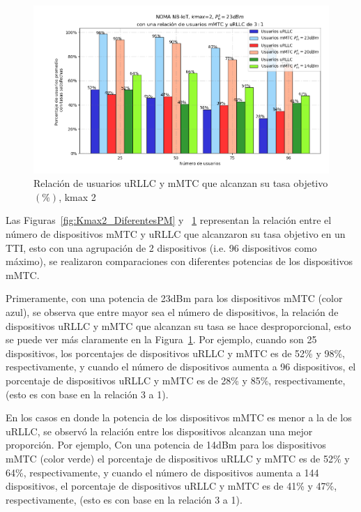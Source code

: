 \begin{figure}[th]
    \centering
    \includegraphics[scale=.6]{Figures/ResultadosNOMA/Kmax2_DiferentesPM_Porcentual.png}
    \decoRule
    \caption[Relación de usuarios uRLLC y mMTC que alcanzan su tasa objetivo $(\%)$, kmax 2]{Relación de usuarios uRLLC y mMTC que alcanzan su tasa objetivo$(\%)$, kmax 2}
    \label{fig:Kmax2_DiferentesPM_Porcentual}
\end{figure}

Las Figuras~\ref{fig:Kmax2_DiferentesPM} y ~\ref{fig:Kmax2_DiferentesPM_Porcentual} representan la relación entre el número de dispositivos mMTC y uRLLC que alcanzaron su tasa objetivo en un TTI, esto con una agrupación de 2 dispositivos (i.e. 96 dispositivos como máximo), se realizaron comparaciones con diferentes potencias de los dispositivos mMTC.\newline

Primeramente, con una potencia de 23dBm para los dispositivos mMTC (color azul), se observa que entre mayor sea el número de dispositivos, la relación de dispositivos uRLLC y mMTC que alcanzan su tasa se hace desproporcional, esto se puede ver más claramente en la Figura~\ref{fig:Kmax2_DiferentesPM_Porcentual}. Por ejemplo, cuando son 25 dispositivos, los porcentajes de dispositivos uRLLC y mMTC es de 52\% y 98\%, respectivamente, y cuando el número de dispositivos aumenta a 96 dispositivos, el porcentaje de dispositivos uRLLC y mMTC es de 28\% y 85\%, respectivamente, (esto es con base en la relación 3 a 1). \newline

En los casos en donde la potencia de los dispositivos mMTC es menor a la de los uRLLC, se observó la relación entre los dispositivos alcanzan una mejor proporción. Por ejemplo, Con una potencia de 14dBm para los dispositivos mMTC (color verde) el porcentaje de dispositivos uRLLC y mMTC es de 52\% y 64\%, respectivamente, y cuando el número de dispositivos aumenta a 144 dispositivos, el porcentaje de dispositivos uRLLC y mMTC es de 41\% y 47\%, respectivamente, (esto es con base en la relación 3 a 1). \newline


